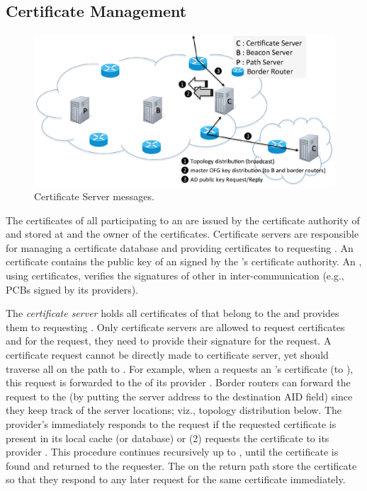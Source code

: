 
\subsection{Certificate Management} 

\begin{figure}[ht]
\centering
\includegraphics[width=.9\columnwidth]{./fig/cs_message.eps}
\caption{Certificate Server messages.}\label{fig:cs-message}
\end{figure}

 The certificates of all participating \ADs to an \ISD are issued by the certificate authority of \ISD and stored at \ISDC \ADs and the owner of the certificates. Certificate servers are responsible for managing a certificate database and providing certificates to requesting \ADs. An \AD certificate contains the public key of an \AD signed by the \ISD's certificate authority. An \AD, using \AD certificates, verifies the signatures of other \ADs in inter-\AD communication (e.g., PCBs signed by its providers).

The {\em \ISDC certificate server} holds all certificates of \ADs that belong to the \ISD and provides them to requesting \ADs. Only certificate servers are allowed to request \AD certificates and for the request, they need to provide their signature for the request. A certificate request cannot be directly made to \ISDC certificate server, yet should traverse all \CSs on the path to \ISDC. For example, when a \STUB \AD requests an \AD's certificate (to \ISDC), this request is forwarded to the \CS of its provider \AD. Border routers can forward the request to the \CS (by putting the server address to the destination AID field) since they keep track of the server locations; viz., topology distribution below. The provider's \CS immediately responds to the request if the requested certificate is present in its local cache (or database) or (2) requests the certificate to its provider \AD. This procedure continues recursively up to \ISDC, until the certificate is found and returned to the requester. The \CSs on the return path store the certificate so that they respond to any later request for  the same certificate immediately. 

